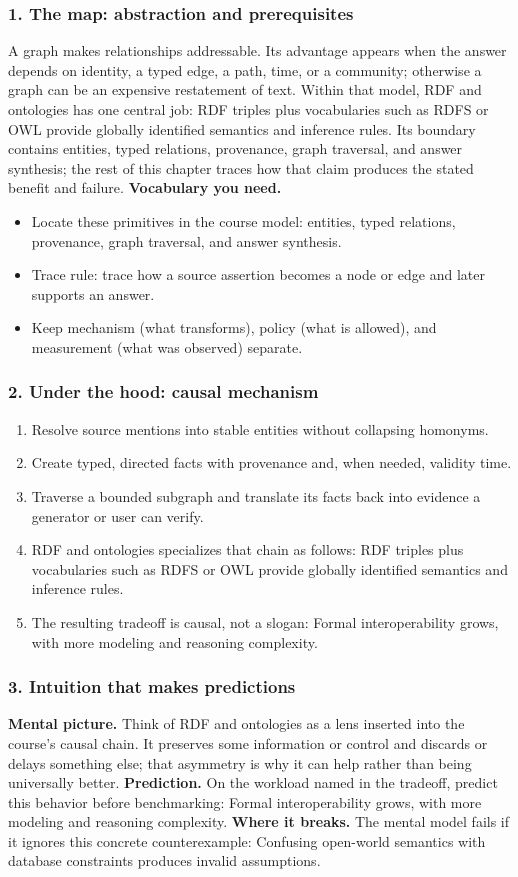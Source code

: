 \subsubsection*{1. The map: abstraction and prerequisites}
A graph makes relationships addressable. Its advantage appears when the answer depends on identity, a typed edge, a path, time, or a community; otherwise a graph can be an expensive restatement of text.
Within that model, RDF and ontologies has one central job: RDF triples plus vocabularies such as RDFS or OWL provide globally identified semantics and inference rules. Its boundary contains entities, typed relations, provenance, graph traversal, and answer synthesis; the rest of this chapter traces how that claim produces the stated benefit and failure.
\textbf{Vocabulary you need.}\begin{itemize}
\item Locate these primitives in the course model: entities, typed relations, provenance, graph traversal, and answer synthesis.
\item Trace rule: trace how a source assertion becomes a node or edge and later supports an answer.
\item Keep mechanism (what transforms), policy (what is allowed), and measurement (what was observed) separate.
\end{itemize}
\subsubsection*{2. Under the hood: causal mechanism}\begin{enumerate}
\item Resolve source mentions into stable entities without collapsing homonyms.
\item Create typed, directed facts with provenance and, when needed, validity time.
\item Traverse a bounded subgraph and translate its facts back into evidence a generator or user can verify.
\item RDF and ontologies specializes that chain as follows: RDF triples plus vocabularies such as RDFS or OWL provide globally identified semantics and inference rules.
\item The resulting tradeoff is causal, not a slogan: Formal interoperability grows, with more modeling and reasoning complexity.
\end{enumerate}
\subsubsection*{3. Intuition that makes predictions}
\textbf{Mental picture.} Think of RDF and ontologies as a lens inserted into the course's causal chain. It preserves some information or control and discards or delays something else; that asymmetry is why it can help rather than being universally better.
\textbf{Prediction.} On the workload named in the tradeoff, predict this behavior before benchmarking: Formal interoperability grows, with more modeling and reasoning complexity.
\textbf{Where it breaks.} The mental model fails if it ignores this concrete counterexample: Confusing open-world semantics with database constraints produces invalid assumptions.
